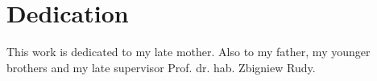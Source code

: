 \documentclass[12pt]{report}
\begin{document}
 
\chapter*{Dedication}
This work is dedicated to my late mother. Also to my father, my younger brothers and my late supervisor Prof. dr. hab. Zbigniew Rudy.
 
 
\end{document}
